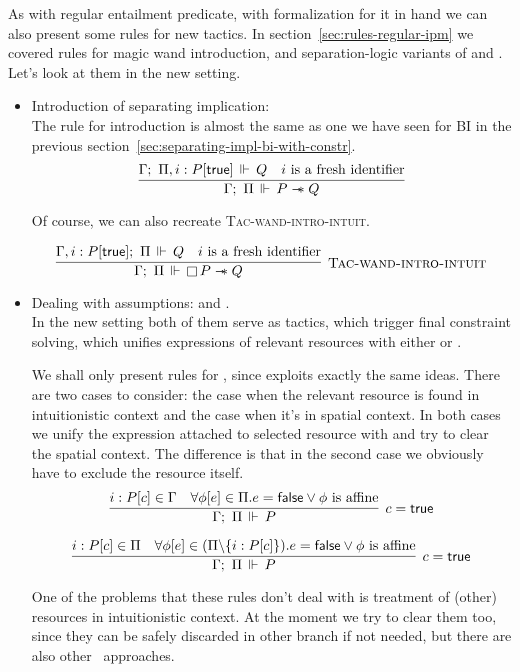 As with regular entailment predicate, with formalization for it in hand we can also present some rules for new tactics.
In section~\ref{sec:rules-regular-ipm} we covered rules for magic wand introduction,  and separation-logic variants of  and .
Let's look at them in the new setting.

\begin{itemize}
\item Introduction of separating implication: \\
  The rule for introduction is almost the same as one we have seen for BI in the previous section~\ref{sec:separating-impl-bi-with-constr}.
  \[
  \infer{\entailsD P \wand Q}
        {\entails {\IntuD} {\SpatD, i : P[\true]} {Q} &
         i \text{ is a fresh identifier}}
  \]

  Of course, we can also recreate \textsc{Tac-wand-intro-intuit}.

  \[\infer[\textsc{Tac-wand-intro-intuit}]
      {\entailsD \intuit P \wand Q}
      {\entails {\IntuD, i : P[\true]} {\SpatD} {Q} &
       i \text{ is a fresh identifier}}
  \]

\item Dealing with assumptions:  and .\\
  In the new setting both of them serve as tactics, which trigger final constraint solving, which unifies expressions of relevant resources with either \true or \false.

  We shall only present rules for , since  exploits exactly the same ideas.
  There are two cases to consider: the case when the relevant resource is found in intuitionistic context and the case when it's in spatial context.
  In both cases we unify the expression attached to selected resource with \true and try to clear the spatial context.
  The difference is that in the second case we obviously have to exclude the resource itself.
  \[
    \infer[c = \true]
          {\entailsD P}
          {i : P[c] \in \IntuD &
           \forall \phi[e] \in \SpatD. e = \false \vee \phi \text{ is affine}}
  \]

  \[
    \infer[c = \true]
          {\entailsD P}
          {i : P[c] \in \SpatD &
           \forall \phi[e] \in (\SpatD \backslash \{i : P[c]\}). e = \false \vee \phi \text{ is affine}}
  \]

  One of the problems that these rules don't deal with is treatment of (other) resources in intuitionistic context.
  At the moment we try to clear them too, since they can be safely discarded in other branch if not needed, but there are also other~\cite[Section 15.3]{pfenningLogicProgrammingLecture2007} approaches.


\end{itemize}
